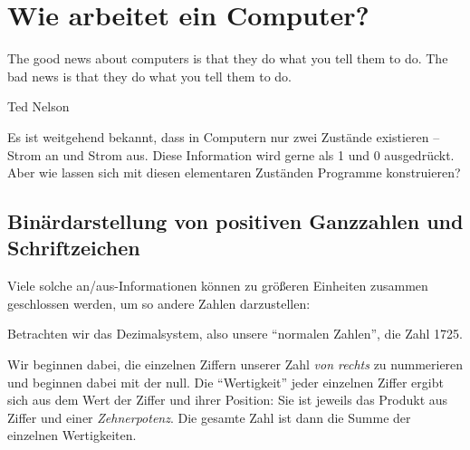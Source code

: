 \chapter{Wie arbeitet ein Computer?}
\epigraph{The good news about computers is that they do what you tell them to do. The bad news is that they do what you tell them to do.}{Ted Nelson}

Es ist weitgehend bekannt, dass in Computern nur zwei Zustände existieren -- Strom an und Strom aus. Diese Information wird gerne als 1 und 0 ausgedrückt. Aber wie lassen sich mit diesen elementaren Zuständen Programme konstruieren?

\section{Binärdarstellung von positiven Ganzzahlen und Schriftzeichen}\label{sec:BinaryNumbers}
Viele solche an/aus-Informationen können zu größeren Einheiten zusammen geschlossen werden, um so andere Zahlen darzustellen:

Betrachten wir das Dezimalsystem, also unsere \enquote{normalen Zahlen}, \eg die Zahl 1725.
\begin{tcolorbox}
	[title=Zerlegung einer Dezimalzahl,
	 arc=0pt,
	 outer arc=0pt
	]
\begin{center}
\end{center}
\end{tcolorbox}

Wir beginnen dabei, die einzelnen Ziffern unserer Zahl \emph{von rechts} zu nummerieren und beginnen dabei mit der null. Die \enquote{Wertigkeit} jeder einzelnen Ziffer ergibt sich aus dem Wert der Ziffer und ihrer Position: Sie ist jeweils das Produkt aus Ziffer und einer \emph{Zehnerpotenz}. Die gesamte Zahl ist dann die Summe der einzelnen Wertigkeiten.

